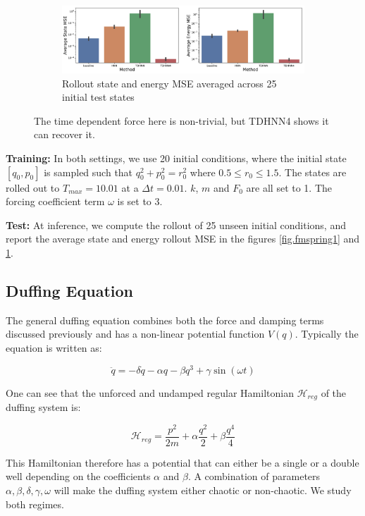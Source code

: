 \documentclass[twoside]{article}
\begin{document}
\begin{figure}[h!]
\begin{subfigure}[b]{0.48\textwidth}
	    \centering
		\includegraphics[width=\textwidth]{figures/mass_spring_forced_2_errors.pdf}
		\caption{Rollout state and energy MSE averaged across 25 initial test states}
	\end{subfigure}
\caption{The time dependent force here is non-trivial, but TDHNN4 shows it can recover it.}
\label{fig.fmspring2}
\end{figure}
\textbf{Training:} In both settings, we use 20 initial conditions, where the initial state $[q_0,p_0]$ is sampled such that $q_0^2 +p_0^2 =r_0^2$ where $0.5 \leq r_0 \leq 1.5$. The states are rolled out to $T_{max}=10.01$ at a $\Delta t = 0.01$. $k$, $m$ and $F_0$ are all set to 1. The forcing coefficient term $\omega$ is set to 3. 

\textbf{Test:} At inference, we compute the rollout of 25 unseen initial conditions, and report the average state and energy rollout MSE in the figures \ref{fig.fmspring1} and \ref{fig.fmspring2}.

\subsection{Duffing Equation}

The general duffing equation combines both the force and damping terms discussed previously and has a non-linear potential function $V(q)$. Typically the equation is written as:

\begin{equation}
\ddot{q} = -\delta \dot{q} -\alpha q -\beta q^3 +\gamma \sin(\omega t) 
\end{equation}

One can see that the unforced and undamped regular Hamiltonian $\mathcal{H}_{reg}$ of the duffing system is:

\begin{equation}
\mathcal{H}_{reg} = \frac{p^2}{2m}+ \alpha \frac{q^2}{2} + \beta \frac{q^4}{4}
\end{equation}

This Hamiltonian therefore has a potential that can either be a single or a double well depending on the coefficients $\alpha$ and $\beta$. A combination of parameters $\alpha,\beta,\delta,\gamma,\omega$ will make the duffing system either chaotic or non-chaotic. We study both regimes.
\end{document}
